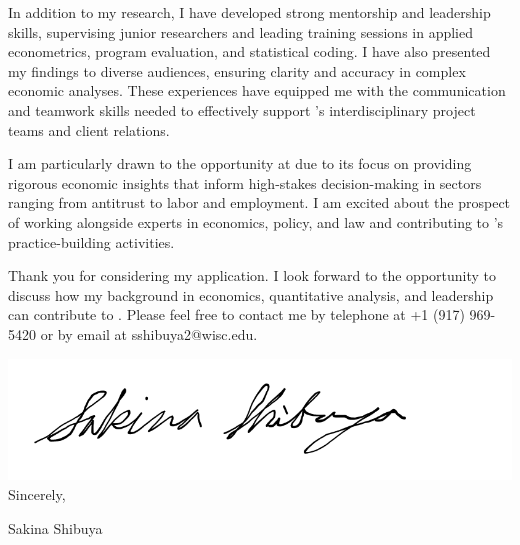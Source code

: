 \documentclass[12pt]{letter}
\begin{document}
In addition to my research, I have developed strong mentorship and leadership skills, supervising junior researchers and leading training sessions 
in applied econometrics, program evaluation, and statistical coding. I have also presented my findings to diverse audiences, ensuring clarity and accuracy 
in complex economic analyses. These experiences have equipped me with the communication and teamwork skills needed to effectively support 
\compName's interdisciplinary project teams and client relations.

I am particularly drawn to the opportunity at \compName \vspace{1mm} due to its focus on providing rigorous economic insights that inform high-stakes decision-making in 
sectors ranging from antitrust to labor and employment. I am excited about the prospect of working alongside experts in economics, policy, and law and 
contributing to \compName's practice-building activities.

Thank you for considering my application. I look forward to the opportunity to discuss how my background in economics, quantitative analysis, and 
leadership can contribute to \compName. Please feel free to contact me by telephone at +1 (917) 969-5420 or by email at sshibuya2@wisc.edu.

\bigskip

\includegraphics[height=4\baselineskip]{signature.png}  \\

\vspace*{-6.5\baselineskip}Sincerely, 

\vspace{2.5\baselineskip}Sakina Shibuya
\end{document}

